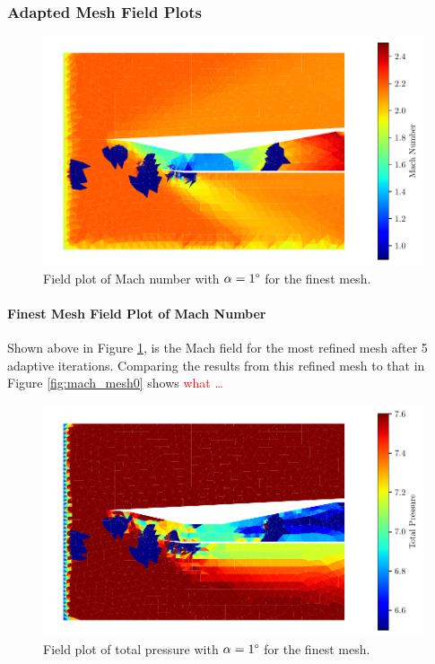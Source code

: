 \pagebreak
\subsubsection{Adapted Mesh Field Plots}
\begin{figure}[h]
    \centering
    \includegraphics[width = 0.9\linewidth]{rep/q4/Machfield.pdf}
    \caption[Field Plot of Mach Number for Adapted Mesh]{Field plot of Mach number with $\alpha = 1\degree$ for the finest mesh.}
    \label{fig:adapted_mach}
\end{figure}

\paragraph{Finest Mesh Field Plot of Mach Number} Shown above in Figure \ref{fig:adapted_mach}, is the Mach field for the most refined mesh after 5 adaptive iterations. Comparing the results from this refined mesh to that in Figure \ref{fig:mach_mesh0} shows \textcolor{red}{what \ldots}

\pagebreak
\begin{figure}[h]
    \centering
    \includegraphics[width = 0.9\linewidth]{rep/q4/Pfield.pdf}
    \caption[Field Plot of Total Pressure for Adapted Mesh]{Field plot of total pressure with $\alpha = 1\degree$ for the finest mesh.}
    \label{fig:adapted_pt}
\end{figure}

